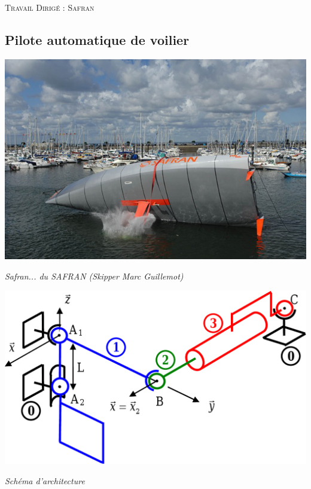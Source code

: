 \documentclass[10pt]{article}
\begin{document}

\begin{center}
\Large{\textsc{Travail Dirigé : Safran}}
\end{center}


\vspace{.25cm}

\subsection*{Pilote automatique de voilier}
\begin{minipage}[c]{.45\linewidth}
\begin{center}
\includegraphics[width=.8\linewidth]{images/safran}

\textit{Safran... du SAFRAN (Skipper Marc Guillemot)}
\end{center}
\end{minipage} \hfill
\begin{minipage}[c]{.45\linewidth}
\begin{center}
\includegraphics[width=\linewidth]{images/safran2}

\textit{Schéma d'architecture}
\end{center}
\end{minipage}
\end{document}
